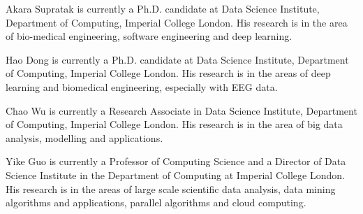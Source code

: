 \documentclass[journal,twoside]{IEEEtran}
\begin{document}
\newpage

\begin{IEEEbiography}{Akara Supratak}
is currently a Ph.D. candidate at Data Science Institute, Department of Computing, Imperial College London. His research is in the area of bio-medical engineering, software engineering and deep learning.
\end{IEEEbiography}

\begin{IEEEbiography}{Hao Dong}
is currently a Ph.D. candidate at Data Science Institute, Department of Computing, Imperial College London. His research is in the areas of deep learning and biomedical engineering, especially with EEG data.
\end{IEEEbiography}

\begin{IEEEbiography}{Chao Wu}
is currently a Research Associate in Data Science Institute, Department of Computing, Imperial College London. His research is in the area of big data analysis, modelling and applications.
\end{IEEEbiography}

\begin{IEEEbiography}{Yike Guo}
is currently a Professor of Computing Science and a Director of Data Science Institute in the Department of Computing at Imperial College London. His research is in the areas of large scale scientific data analysis, data mining algorithms and applications, parallel algorithms and cloud computing.
\end{IEEEbiography}

\vfill
\end{document}
